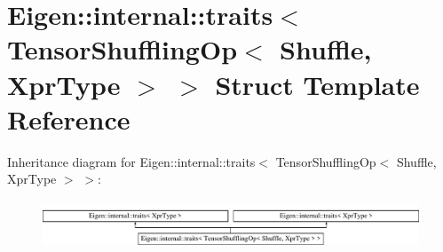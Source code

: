 \hypertarget{struct_eigen_1_1internal_1_1traits_3_01_tensor_shuffling_op_3_01_shuffle_00_01_xpr_type_01_4_01_4}{}\section{Eigen\+:\+:internal\+:\+:traits$<$ Tensor\+Shuffling\+Op$<$ Shuffle, Xpr\+Type $>$ $>$ Struct Template Reference}
\label{struct_eigen_1_1internal_1_1traits_3_01_tensor_shuffling_op_3_01_shuffle_00_01_xpr_type_01_4_01_4}
Inheritance diagram for Eigen\+:\+:internal\+:\+:traits$<$ Tensor\+Shuffling\+Op$<$ Shuffle, Xpr\+Type $>$ $>$\+:\begin{figure}[H]
\begin{center}
\leavevmode
\includegraphics[height=1.454545cm]{struct_eigen_1_1internal_1_1traits_3_01_tensor_shuffling_op_3_01_shuffle_00_01_xpr_type_01_4_01_4}
\end{center}
\end{figure}
